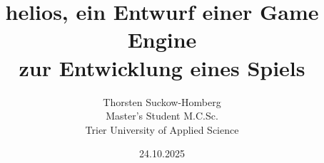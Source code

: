 \documentclass[peerreview]{IEEEtran}
\theoremstyle{definition} %
\begin{document}
\title{helios, ein Entwurf einer Game Engine \\zur Entwicklung eines Spiels}



\author{Thorsten Suckow-Homberg \\
Master's Student M.C.Sc.\\
Trier University of Applied Science
}
\date{24.10.2025}

\maketitle
\tableofcontents
\listoffigures
\listoftables

\IEEEpeerreviewmaketitle









\clearpage
\sloppy
\printbibliography
\fussy
\end{document}

